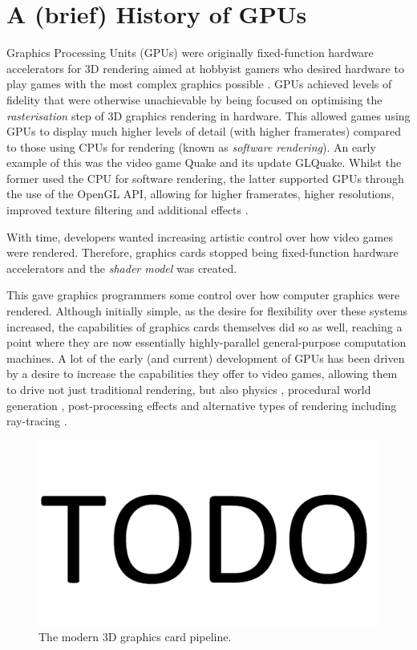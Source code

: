\documentclass[a4paper,12pt,twoside,openright]{report}
\begin{document}
\section{A (brief) History of GPUs}

\label{sec:history_gpu}

Graphics Processing Units (GPUs) were originally fixed-function hardware
accelerators for 3D rendering aimed at hobbyist gamers who desired hardware to
play games with the most complex graphics possible \cite{TODO}. GPUs achieved
levels of fidelity that were otherwise unachievable by being focused on
optimising the \textit{rasterisation} step of 3D graphics rendering in
hardware. This allowed games using GPUs to display much higher levels of detail
(with higher framerates) compared to those using CPUs for rendering (known as
\textit{software rendering}). An early example of this was the video game Quake
and its update GLQuake. Whilst the former used the CPU for software rendering,
the latter supported GPUs through the use of the OpenGL API, allowing for
higher framerates, higher resolutions, improved texture filtering and
additional effects \cite{GLQuake}.

With time, developers wanted increasing artistic control over how video games
were rendered. Therefore, graphics cards stopped being fixed-function hardware
accelerators and the \textit{shader model} was created.

This gave graphics programmers some control over how computer graphics were
rendered. Although initially simple, as the desire for flexibility over these
systems increased, the capabilities of graphics cards themselves did so as
well, reaching a point where they are now essentially highly-parallel
general-purpose computation machines. A lot of the early (and current)
development of GPUs has been driven by a desire to increase the capabilities
they offer to video games, allowing them to drive not just traditional
rendering, but also physics \cite{TODO}, procedural world generation
\cite{TODO}, post-processing effects \cite{TODO} and alternative types of
rendering including ray-tracing \cite{TODO}.

\begin{figure}[h]
\centering
\includegraphics[width=0.8\linewidth]{TODO}
\caption{The modern 3D graphics card pipeline.}
\label{fig:graphics_pipeline}
\end{figure}
\end{document}
